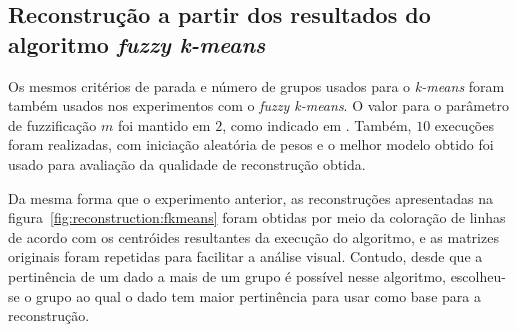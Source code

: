 \documentclass[
    12pt,                %
    oneside,            %
    a4paper,            %
    english,            %
    brazil                %
    ]{abntex2ppgsi}
\begin{document}
\subsection{Reconstrução a partir dos resultados do algoritmo \textit{fuzzy k-means}}
\label{subsec:results-reconstruction-fkmeans}

Os mesmos critérios de parada e número de grupos usados para o \textit{k-means} foram também usados nos experimentos com o \textit{fuzzy k-means}. O valor para o parâmetro de fuzzificação $m$ foi mantido em $2$, como indicado em \cite{Peres2012}. Também, $10$ execuções foram realizadas, com iniciação aleatória de pesos e o melhor modelo obtido foi usado para avaliação da qualidade de reconstrução obtida.


Da mesma forma que o experimento anterior, as reconstruções apresentadas na figura~\ref{fig:reconstruction:fkmeans} foram obtidas por meio da coloração de linhas de acordo com os centróides resultantes da execução do algoritmo, e as matrizes originais foram repetidas para facilitar a análise visual. Contudo, desde que a pertinência de um dado a mais de um grupo é possível nesse algoritmo, escolheu-se o grupo ao qual o dado tem maior pertinência para usar como base para a reconstrução.
\end{document}
